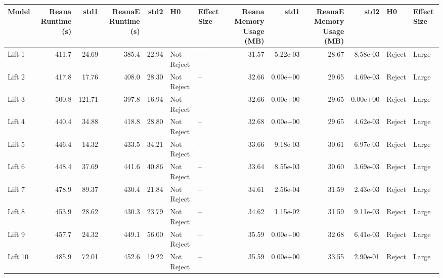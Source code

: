 \begin{tabular}{lrrrrllrrrrll}
\toprule
   Model &  Reana Runtime (s) &    std1 &  ReanaE Runtime (s) &   std2 &          H0 & Effect Size &  Reana Memory Usage (MB) &      std1 &  ReanaE Memory Usage (MB) &      std2 &      H0 & Effect Size \\
\midrule
  Lift 1 &              411.7 &   24.69 &               385.4 &  22.94 &  Not Reject &          -- &                    31.57 &  5.22e-03 &                     28.67 &  8.58e-03 &  Reject &       Large \\
  Lift 2 &              417.8 &   17.76 &               408.0 &  28.30 &  Not Reject &          -- &                    32.66 &  0.00e+00 &                     29.65 &  4.69e-03 &  Reject &       Large \\
  Lift 3 &              500.8 &  121.71 &               397.8 &  16.94 &  Not Reject &          -- &                    32.66 &  0.00e+00 &                     29.65 &  0.00e+00 &  Reject &       Large \\
  Lift 4 &              440.4 &   34.88 &               418.8 &  28.80 &  Not Reject &          -- &                    32.68 &  0.00e+00 &                     29.65 &  4.62e-03 &  Reject &       Large \\
  Lift 5 &              446.4 &   14.32 &               433.5 &  34.21 &  Not Reject &          -- &                    33.66 &  9.18e-03 &                     30.61 &  6.97e-03 &  Reject &       Large \\
  Lift 6 &              448.4 &   37.69 &               441.6 &  40.86 &  Not Reject &          -- &                    33.64 &  8.55e-03 &                     30.60 &  3.69e-03 &  Reject &       Large \\
  Lift 7 &              478.9 &   89.37 &               430.4 &  21.84 &  Not Reject &          -- &                    34.61 &  2.56e-04 &                     31.59 &  2.43e-03 &  Reject &       Large \\
  Lift 8 &              453.9 &   28.62 &               430.3 &  23.79 &  Not Reject &          -- &                    34.62 &  1.15e-02 &                     31.59 &  9.11e-03 &  Reject &       Large \\
  Lift 9 &              457.7 &   24.32 &               449.1 &  56.00 &  Not Reject &          -- &                    35.59 &  0.00e+00 &                     32.68 &  6.41e-03 &  Reject &       Large \\
 Lift 10 &              485.9 &   72.01 &               452.6 &  19.22 &  Not Reject &          -- &                    35.59 &  0.00e+00 &                     33.55 &  2.90e-01 &  Reject &       Large \\

\end{tabular}
